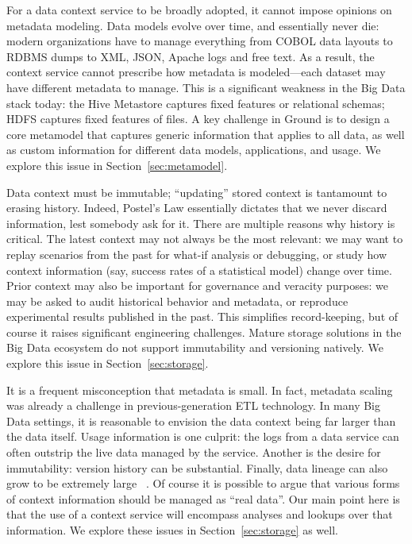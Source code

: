 \documentclass{sig-alternate}
\begin{document}
 For a data context service to be broadly adopted, it cannot impose opinions on metadata modeling. Data models evolve over time, and essentially never die: modern organizations have to manage everything from COBOL data layouts to RDBMS dumps to XML, JSON, Apache logs and free text. As a result, the context service cannot prescribe how metadata is modeled---each dataset may have different metadata to manage. This is a significant weakness in the Big Data stack today: the Hive Metastore captures fixed features or relational schemas; HDFS captures fixed features of files.  A key challenge in Ground is to design a core metamodel that captures generic information that applies to all data, as well as custom information for different data models, applications, and usage. We explore this issue in Section~\ref{sec:metamodel}.

 Data context must be immutable; ``updating'' stored context is tantamount to erasing history. Indeed, Postel's Law essentially dictates that we never discard information, lest somebody ask for it. There are multiple reasons why history is critical. The latest context may not always be the most relevant: we may want to replay scenarios from the past for what-if analysis or debugging, or study how context information (say, success rates of a statistical model) change over time. Prior context may also be important for governance and veracity purposes: we may be asked to audit historical behavior and metadata, or reproduce experimental results published in the past. This simplifies record-keeping, but of course it raises significant engineering challenges.  Mature storage solutions in the Big Data ecosystem do not support immutability and versioning natively.   We explore this issue in Section~\ref{sec:storage}.

 It is a frequent misconception that metadata is small. In fact, metadata scaling was already a challenge in previous-generation ETL technology. In many Big Data settings, it is reasonable to envision the data context being far larger than the data itself. Usage information is one culprit: the logs from a data service can often outstrip the live data managed by the service. Another is the  desire for immutability: version history can be substantial. Finally, data lineage can also grow to be extremely large
~\cite{cheney2009provenance}.  Of course it is possible to argue that various forms of context information should be managed as ``real data''.  Our main point here is that the use of a context service will encompass analyses and lookups over that information.  We explore these issues in Section~\ref{sec:storage} as well.
\end{document}
